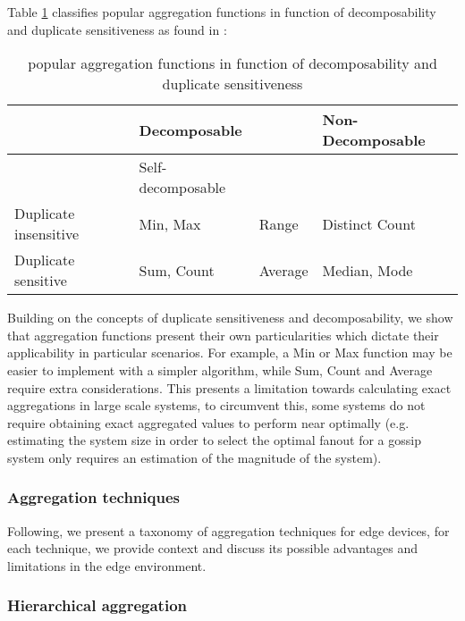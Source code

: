 Table \ref{table:aggregation_functions} classifies popular aggregation functions in function of decomposability and duplicate sensitiveness as found in \cite{DBLP:journals/corr/abs-1110-0725}:

\begin{table}[]
    \begin{tabular}{|l|l|l|l|}
    \hline
                          & \multicolumn{2}{l|}{Decomposable} & Non-Decomposable  \\ \hline
                          & Self-decomposable    &                             &  \\ \hline
    Duplicate insensitive & Min, Max             & Range     & Distinct Count    \\ \hline
    Duplicate sensitive   & Sum, Count           & Average   & Median, Mode     \\ \hline
    \end{tabular}
    \caption{popular aggregation functions in function of decomposability and duplicate sensitiveness}
    \label{table:aggregation_functions}
\end{table}

Building on the concepts of duplicate sensitiveness and decomposability, we show that aggregation functions present their own particularities which dictate their applicability in particular scenarios. For example, a Min or Max function may be easier to implement with a simpler algorithm, while Sum, Count and Average require extra considerations. This presents a limitation towards calculating exact aggregations in large scale systems, to circumvent this, some systems do not require obtaining exact aggregated values to perform near optimally  (e.g. estimating the system size in order to select the optimal fanout for a gossip system only requires an estimation of the magnitude of the system). 

\subsubsection{Aggregation techniques}

Following, we present a taxonomy of aggregation techniques for edge devices, for each technique, we provide context and discuss its possible advantages and limitations in the edge environment.

\subsubsection{Hierarchical aggregation}

